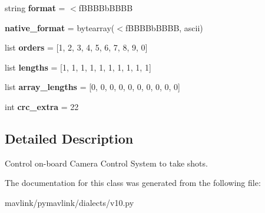 \begin{DoxyCompactItemize}
\mbox{\label{classpymavlink_1_1dialects_1_1v10_1_1MAVLink__digicam__control__message_a3418eef555fdb19227f6c7acc4001f4e}} 
string {\bfseries format} = \textquotesingle{}$<$f\+B\+B\+B\+Bb\+B\+B\+BB\textquotesingle{}
\item 
\mbox{\label{classpymavlink_1_1dialects_1_1v10_1_1MAVLink__digicam__control__message_a8d7571ed4cb4eeee1bbd33ccc5edb9a0}} 
{\bfseries native\+\_\+format} = bytearray(\textquotesingle{}$<$f\+B\+B\+B\+Bb\+B\+B\+BB\textquotesingle{}, \textquotesingle{}ascii\textquotesingle{})
\item 
\mbox{\label{classpymavlink_1_1dialects_1_1v10_1_1MAVLink__digicam__control__message_a11d433ee3dff4ccda2d8f3e4c427e674}} 
list {\bfseries orders} = \mbox{[}1, 2, 3, 4, 5, 6, 7, 8, 9, 0\mbox{]}
\item 
\mbox{\label{classpymavlink_1_1dialects_1_1v10_1_1MAVLink__digicam__control__message_a31bc6d645d822092b7b869c6e45ee49e}} 
list {\bfseries lengths} = \mbox{[}1, 1, 1, 1, 1, 1, 1, 1, 1, 1\mbox{]}
\item 
\mbox{\label{classpymavlink_1_1dialects_1_1v10_1_1MAVLink__digicam__control__message_a59d2ac6d50fb25f505f9ffe9ce2af74e}} 
list {\bfseries array\+\_\+lengths} = \mbox{[}0, 0, 0, 0, 0, 0, 0, 0, 0, 0\mbox{]}
\item 
\mbox{\label{classpymavlink_1_1dialects_1_1v10_1_1MAVLink__digicam__control__message_a8f7c5ee97584959958bd97aa0ae52181}} 
int {\bfseries crc\+\_\+extra} = 22
\end{DoxyCompactItemize}


\subsection{Detailed Description}
\begin{DoxyVerb}Control on-board Camera Control System to take shots.
\end{DoxyVerb}
 

The documentation for this class was generated from the following file\+:\begin{DoxyCompactItemize}
\item 
mavlink/pymavlink/dialects/v10.\+py\end{DoxyCompactItemize}

